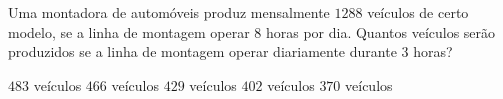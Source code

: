 Uma montadora de automóveis produz mensalmente $1288$ veículos de certo modelo, se a linha de montagem operar $8$ horas por dia. Quantos veículos serão produzidos se a linha de montagem operar diariamente durante $3$ horas?

$483$ veículos
$466$ veículos
$429$ veículos
$402$ veículos
$370$ veículos



